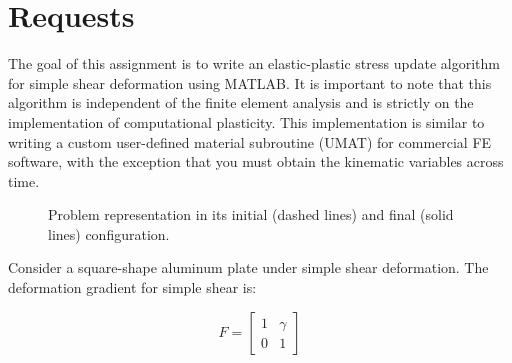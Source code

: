 \section{Requests}
\label{sec:requests}

The goal of this assignment is to write an elastic-plastic stress update algorithm for simple shear deformation using MATLAB.
It is important to note that this algorithm is independent of the finite element analysis and is strictly on the implementation of computational plasticity.
This implementation is similar to writing a custom user-defined material subroutine (UMAT) for commercial FE software, with the exception that you must obtain the kinematic variables across time.

\begin{figure}[h]
    \centering
    \caption{Problem representation in its initial (dashed lines) and final (solid lines) configuration.}
    \label{fig:problem_representation}
\end{figure}

Consider a square-shape aluminum plate under simple shear deformation.
The deformation gradient for simple shear is:

\begin{equation}
    F = \begin{bmatrix}
        1 & \gamma \\
        0 & 1
    \end{bmatrix}
\end{equation}

